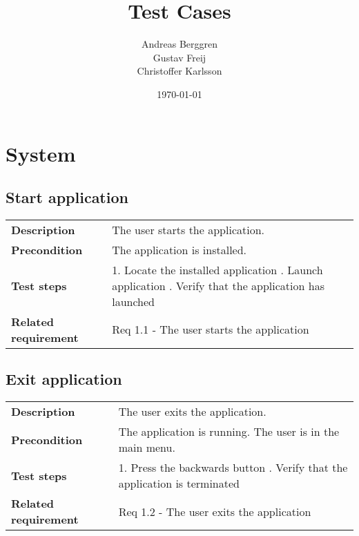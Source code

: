 \documentclass[a4paper,titlepage]{article}
\title{Test Cases}
\author{Andreas Berggren\\
        Gustav Freij\\
        Christoffer Karlsson}
\date{\today}
\begin{document}
\maketitle

\tableofcontents
\newpage

\setcounter{page}{1}

\renewcommand{\arraystretch}{1.5}

\section{System}
\subsection{Start application}
\begin{tabularx}{\textwidth}{lX}
	\textbf{Description}	&
		The user starts the application.\\
	\textbf{Precondition}	&
		The application is installed.\\
	\textbf{Test steps}	&
		1. Locate the installed application \newline
		2. Launch application \newline
		3. Verify that the application has launched \\
	\textbf{Related requirement}	&
		Req 1.1 - The user starts the application \\
\end{tabularx}

\subsection{Exit application}
\begin{tabularx}{\textwidth}{lX}
	\textbf{Description}	&
		The user exits the application.\\
	\textbf{Precondition}	&
		The application is running. \newline
		The user is in the main menu.\\
	\textbf{Test steps}	&
		1.  Press the backwards button	\newline
		2.  Verify that the application is terminated	\\
	\textbf{Related requirement}	&
		Req 1.2 - The user exits the application \\
\end{tabularx}
\end{document}
